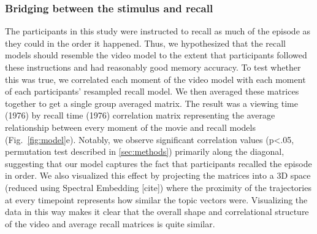 \subsubsection{Bridging between the stimulus and recall}
The participants in this study were instructed to recall as much of the episode as they could in the order it happened.  Thus, we hypothesized that the recall models should resemble the video model to the extent that participants followed these instructions and had reasonably good memory accuracy. To test whether this was true, we correlated each moment of the video model with each moment of each participants' resampled recall model. We then averaged these matrices together to get a single group averaged matrix.  The result was a viewing time (1976) by recall time (1976) correlation matrix representing the average relationship between every moment of the movie and recall models (Fig.~\ref{fig:model}e). Notably, we observe significant correlation values (p<.05, permutation test described in \ref{sec:methods}) primarily along the diagonal, suggesting that our model captures the fact that participants recalled the episode in order. We also visualized this effect by projecting the matrices into a 3D space (reduced using Spectral Embedding [cite]) where the proximity of the trajectories at every timepoint represents how similar the topic vectors were. Visualizing the data in this way makes it clear that the overall shape and correlational structure of the video and average recall matrices is quite similar.
